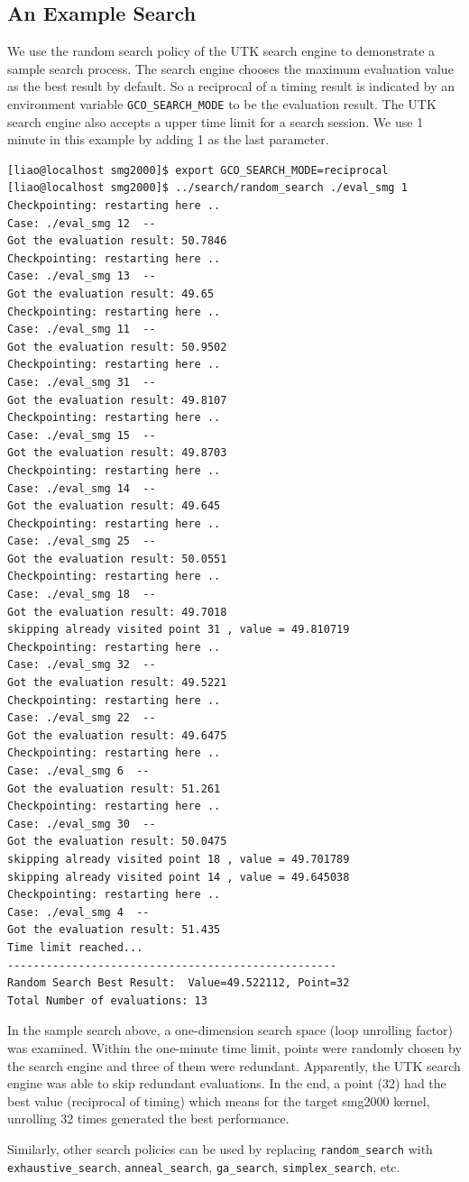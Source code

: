 \subsection{An Example Search}
   We use the random search policy of the UTK search engine to demonstrate a
sample search process. The search engine chooses the maximum evaluation value as the best
result by default. So a reciprocal of a timing result is indicated by an environment
variable \lstinline{GCO_SEARCH_MODE} to be the evaluation result.  The UTK search engine
also accepts a upper time limit for a search session.  We use 1 minute in this example by
adding 1 as the last parameter. 

{\mySmallFontSize
\begin{verbatim}
[liao@localhost smg2000]$ export GCO_SEARCH_MODE=reciprocal
[liao@localhost smg2000]$ ../search/random_search ./eval_smg 1
Checkpointing: restarting here ..
Case: ./eval_smg 12  --
Got the evaluation result: 50.7846
Checkpointing: restarting here ..
Case: ./eval_smg 13  --
Got the evaluation result: 49.65
Checkpointing: restarting here ..
Case: ./eval_smg 11  --
Got the evaluation result: 50.9502
Checkpointing: restarting here ..
Case: ./eval_smg 31  --
Got the evaluation result: 49.8107
Checkpointing: restarting here ..
Case: ./eval_smg 15  --
Got the evaluation result: 49.8703
Checkpointing: restarting here ..
Case: ./eval_smg 14  --
Got the evaluation result: 49.645
Checkpointing: restarting here ..
Case: ./eval_smg 25  --
Got the evaluation result: 50.0551
Checkpointing: restarting here ..
Case: ./eval_smg 18  --
Got the evaluation result: 49.7018
skipping already visited point 31 , value = 49.810719
Checkpointing: restarting here ..
Case: ./eval_smg 32  --
Got the evaluation result: 49.5221
Checkpointing: restarting here ..
Case: ./eval_smg 22  --
Got the evaluation result: 49.6475
Checkpointing: restarting here ..
Case: ./eval_smg 6  --
Got the evaluation result: 51.261
Checkpointing: restarting here ..
Case: ./eval_smg 30  --
Got the evaluation result: 50.0475
skipping already visited point 18 , value = 49.701789
skipping already visited point 14 , value = 49.645038
Checkpointing: restarting here ..
Case: ./eval_smg 4  --
Got the evaluation result: 51.435
Time limit reached...
---------------------------------------------------
Random Search Best Result:  Value=49.522112, Point=32
Total Number of evaluations: 13

\end{verbatim}
}

In the sample search above, a one-dimension search space (loop unrolling
factor) was examined.  
Within the one-minute time limit, points were randomly chosen by the
search engine and three of them were redundant. 
Apparently, the UTK search engine was able to skip redundant evaluations.
In the end, a point (32) had the best value (reciprocal of timing) which
means for the target smg2000 kernel, unrolling 32 times generated the best
performance.

Similarly, other search policies can be used by replacing
\lstinline{random_search} with
\lstinline{exhaustive_search}, \lstinline{anneal_search},
\lstinline{ga_search}, \lstinline{simplex_search}, etc. 
